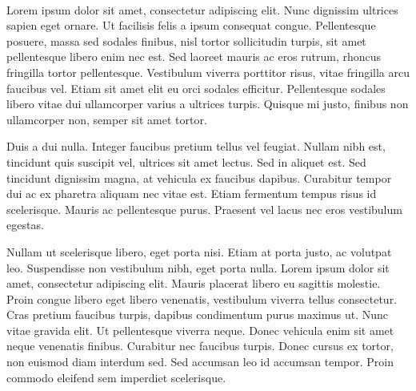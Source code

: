 ~\cite{Nobody06}

Lorem ipsum dolor sit amet, consectetur adipiscing elit. Nunc dignissim ultrices sapien eget ornare. Ut facilisis felis a ipsum consequat congue. Pellentesque posuere, massa sed sodales finibus, nisl tortor sollicitudin turpis, sit amet pellentesque libero enim nec est. Sed laoreet mauris ac eros rutrum, rhoncus fringilla tortor pellentesque. Vestibulum viverra porttitor risus, vitae fringilla arcu faucibus vel. Etiam sit amet elit eu orci sodales efficitur. Pellentesque sodales libero vitae dui ullamcorper varius a ultrices turpis. Quisque mi justo, finibus non ullamcorper non, semper sit amet tortor.

Duis a dui nulla. Integer faucibus pretium tellus vel feugiat. Nullam nibh est, tincidunt quis suscipit vel, ultrices sit amet lectus. Sed in aliquet est. Sed tincidunt dignissim magna, at vehicula ex faucibus dapibus. Curabitur tempor dui ac ex pharetra aliquam nec vitae est. Etiam fermentum tempus risus id scelerisque. Mauris ac pellentesque purus. Praesent vel lacus nec eros vestibulum egestas.

Nullam ut scelerisque libero, eget porta nisi. Etiam at porta justo, ac volutpat leo. Suspendisse non vestibulum nibh, eget porta nulla. Lorem ipsum dolor sit amet, consectetur adipiscing elit. Mauris placerat libero eu sagittis molestie. Proin congue libero eget libero venenatis, vestibulum viverra tellus consectetur. Cras pretium faucibus turpis, dapibus condimentum purus maximus ut. Nunc vitae gravida elit. Ut pellentesque viverra neque. Donec vehicula enim sit amet neque venenatis finibus. Curabitur nec faucibus turpis. Donec cursus ex tortor, non euismod diam interdum sed. Sed accumsan leo id accumsan tempor. Proin commodo eleifend sem imperdiet scelerisque.
